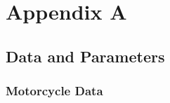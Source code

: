 \appendix
%
\chapter*{Appendix A}
%
\section*{Data and Parameters}
%
\subsection*{Motorcycle Data}
%


    
    
    
    
